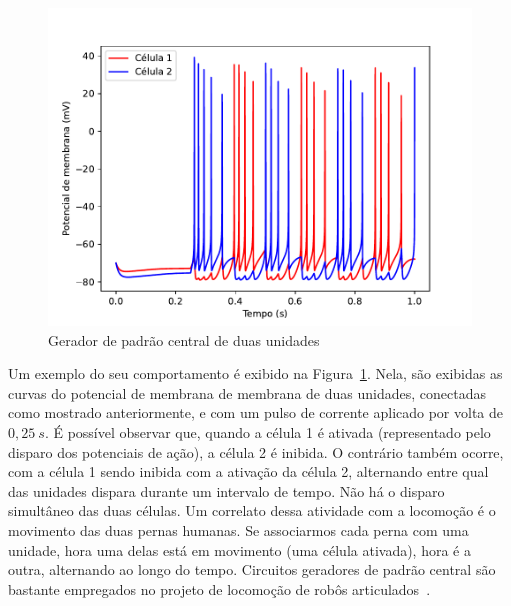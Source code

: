 \begin{figure}[tb]
	\centering
	\caption[Gerador de padrão central de duas unidades]{Gerador de padrão central de duas unidades}
	\label{fig:cpg}
	\includegraphics[width=0.7\linewidth]{figs/cpg}
\end{figure}
Um exemplo do seu comportamento é exibido na Figura~\ref{fig:cpg}. Nela, são exibidas as curvas do potencial de membrana de membrana de duas unidades, conectadas como mostrado anteriormente, e com um pulso de corrente aplicado por volta de $0,25\ s$. É possível observar que, quando a célula 1 é ativada (representado pelo disparo dos potenciais de ação), a célula 2 é inibida. O contrário também ocorre, com a célula 1 sendo inibida com a ativação da célula 2, alternando entre qual das unidades dispara durante um intervalo de tempo. Não há o disparo simultâneo das duas células. Um correlato dessa atividade com a locomoção é o movimento das duas pernas humanas. Se associarmos cada perna com uma unidade, hora uma delas está em movimento (uma célula ativada), hora é a outra, alternando ao longo do tempo. Circuitos geradores de padrão central são bastante empregados no projeto de locomoção de robôs articulados~\cite{ijspeert_central_2008}.

